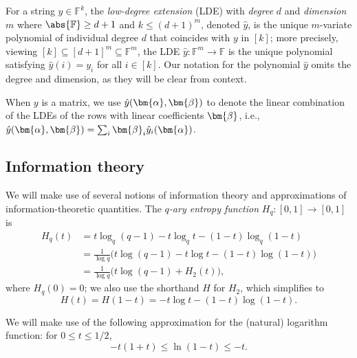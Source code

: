 \documentclass[10pt,a4paper]{article}
\theoremstyle{definition}
\newcommand{\field}{\mathbb{F}}
\newcommand{\dimension}{m}
\newcommand{\degree}{d}
\def\fe#1{
    \ifnum#1=1
        \alpha
    \else
    \ifnum#1=2
        \beta
    \else
    \ifnum#1=3
        \gamma
    \fi\fi\fi
}
\begin{document}
    For a string $y \in \field^k$, the \emph{low-degree extension} (LDE) with \emph{degree} $\degree$ and \emph{dimension} $\dimension$ where $\abs{\field} \geq \degree + 1$ and $k \leq (\degree + 1)^\dimension$, denoted $\hat y$, is the unique $\dimension$-variate polynomial of individual degree $\degree$ that coincides with $y$ in $[k]$; more precisely, viewing $[k] \subseteq [\degree + 1]^\dimension \subseteq \field^\dimension$, the LDE $\hat y: \field^\dimension \to \field$ is the unique polynomial satisfying $\hat y(i) = y_i$ for all $i \in [k]$. Our notation for the polynomial $\hat y$ omits the degree and dimension, as they will be clear from context.
    
    When $y$ is a matrix, we use $\hat y(\bm{\fe1}, \bm{\fe2})$ to denote the linear combination of the LDEs of the rows with linear coefficients $\bm{\fe2}$, i.e., $\hat y(\bm{\fe1}, \bm{\fe2}) = \sum_i \bm{\fe2}_i \hat y_i(\bm{\fe1})$.

    \subsection{Information theory} We will make use of several notions of information theory and approximations of information-theoretic quantities. The \emph{$q$-ary entropy function} $H_q \colon [0,1] \to [0,1]$ is
    \begin{align}
    \label{eq:q-ary-entropy}
        H_q(t) &= t \log_q(q-1) -t \log_q t - (1 - t) \log_q(1 - t)\\
        &= \frac{1}{\log q} \big(t \log(q - 1) - t \log t - (1 - t) \log(1 - t)\big)\nonumber\\
        &= \frac{1}{\log q} \big(t \log(q - 1) + H_2(t)\big),\nonumber
    \end{align}
    where $H_q(0) = 0$; we also use the shorthand $H$ for $H_2$, which simplifies to
    \begin{equation}
    \label{eq:binary-entropy}
        H(t) = H(1 - t) = -t \log t - (1 - t) \log(1 - t).
    \end{equation}

    We will make use of the following approximation for the (natural) logarithm function: for $0 \leq t \leq 1/2$,
    \begin{equation}
    \label{eq:log-approximation}
        -t (1 + t) \leq \ln(1-t) \leq -t.
    \end{equation}
    
\end{document}
